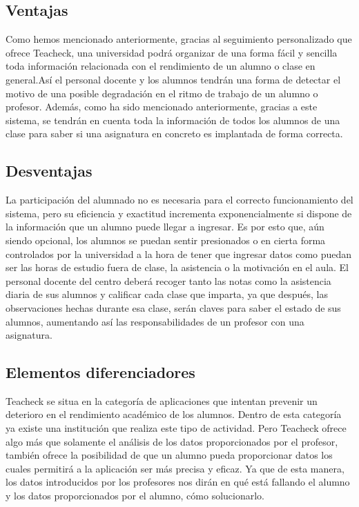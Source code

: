 \subsection{Ventajas}
Como hemos mencionado anteriormente, gracias al seguimiento personalizado que ofrece Teacheck, una universidad podrá organizar de una forma fácil y sencilla toda información relacionada con el rendimiento de un alumno o clase en general.Así el  personal docente y los alumnos tendrán una forma de detectar el motivo de una posible degradación en el ritmo de trabajo de un alumno o profesor.
Además, como ha sido mencionado anteriormente, gracias a este sistema, se tendrán en cuenta toda la información de todos los alumnos de una clase para saber si una asignatura en concreto es implantada de forma correcta.
\subsection{Desventajas}
La participación del alumnado no es necesaria para el correcto funcionamiento del sistema, pero su eficiencia y exactitud incrementa exponencialmente si dispone de la información que un alumno puede llegar a ingresar. Es por esto que, aún siendo opcional, los alumnos se puedan sentir presionados o en cierta forma controlados por la universidad a la hora de tener que ingresar datos como puedan ser las horas de estudio fuera de clase, la asistencia o la motivación en el aula.
El personal docente del centro deberá recoger tanto las notas como la asistencia diaria de sus alumnos y calificar cada clase que imparta, ya que después, las observaciones hechas durante esa clase, serán claves para saber el estado de sus alumnos, aumentando así las responsabilidades de un profesor con una asignatura.
\subsection{Elementos diferenciadores}
Teacheck se situa en la categoría de aplicaciones que intentan prevenir un deterioro en el rendimiento académico de los alumnos. Dentro de esta categoría ya existe una institución que realiza este tipo de actividad. Pero Teacheck ofrece algo más que solamente el análisis de los datos proporcionados por el profesor, también ofrece la posibilidad de que un alumno pueda proporcionar datos los cuales permitirá a la aplicación ser más precisa y eficaz.
Ya que de esta manera, los datos introducidos por los profesores nos dirán en qué está fallando el alumno y los datos proporcionados por el alumno, cómo solucionarlo.

